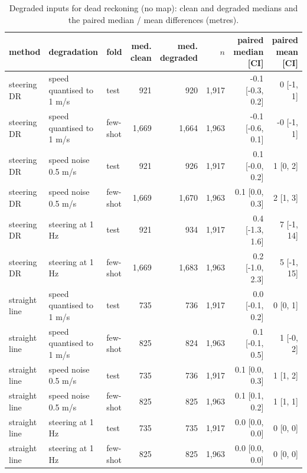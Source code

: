 \begin{table}[t]\centering\scriptsize\setlength{\tabcolsep}{3pt}
\caption{Degraded inputs for dead reckoning (no map): clean and degraded medians and the paired median / mean differences (metres).}\label{tab:supp_robust_dr}
\begin{tabular}{lllrrrrr}\toprule
method & degradation & fold & med. clean & med. degraded & $n$ & paired median [CI] & paired mean [CI] \\\midrule
steering DR & speed quantised to 1 m/s & test & 921 & 920 & 1{,}917 & -0.1 [-0.3, 0.2] & 0 [-1, 1] \\
steering DR & speed quantised to 1 m/s & few-shot & 1{,}669 & 1{,}664 & 1{,}963 & -0.1 [-0.6, 0.1] & -0 [-1, 1] \\
steering DR & speed noise 0.5 m/s & test & 921 & 926 & 1{,}917 & 0.1 [-0.0, 0.2] & 1 [0, 2] \\
steering DR & speed noise 0.5 m/s & few-shot & 1{,}669 & 1{,}670 & 1{,}963 & 0.1 [0.0, 0.3] & 2 [1, 3] \\
steering DR & steering at 1 Hz & test & 921 & 934 & 1{,}917 & 0.4 [-1.3, 1.6] & 7 [-1, 14] \\
steering DR & steering at 1 Hz & few-shot & 1{,}669 & 1{,}683 & 1{,}963 & 0.2 [-1.0, 2.3] & 5 [-1, 15] \\
straight line & speed quantised to 1 m/s & test & 735 & 736 & 1{,}917 & 0.0 [-0.1, 0.2] & 0 [0, 1] \\
straight line & speed quantised to 1 m/s & few-shot & 825 & 824 & 1{,}963 & 0.1 [-0.1, 0.5] & 1 [-0, 2] \\
straight line & speed noise 0.5 m/s & test & 735 & 736 & 1{,}917 & 0.1 [0.0, 0.3] & 1 [1, 2] \\
straight line & speed noise 0.5 m/s & few-shot & 825 & 825 & 1{,}963 & 0.1 [0.1, 0.2] & 1 [1, 1] \\
straight line & steering at 1 Hz & test & 735 & 735 & 1{,}917 & 0.0 [0.0, 0.0] & 0 [0, 0] \\
straight line & steering at 1 Hz & few-shot & 825 & 825 & 1{,}963 & 0.0 [0.0, 0.0] & 0 [0, 0] \\
\bottomrule\end{tabular}
\end{table}
